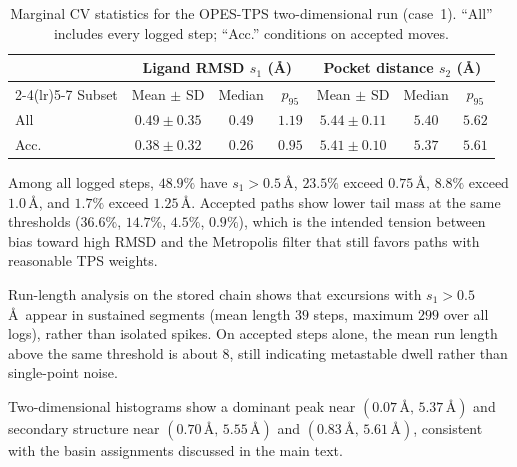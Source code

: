 \begin{table}[t]
\centering
\caption{Marginal CV statistics for the OPES-TPS two-dimensional run (case~1). ``All'' includes every logged step; ``Acc.'' conditions on accepted moves.}
\label{tab:cv-stats-si}
\begin{tabular}{lcccccc}
\toprule
 & \multicolumn{3}{c}{Ligand RMSD $s_1$ (\AA)} & \multicolumn{3}{c}{Pocket distance $s_2$ (\AA)} \\
\cmidrule(lr){2-4}\cmidrule(lr){5-7}
Subset & Mean $\pm$ SD & Median & $p_{95}$ & Mean $\pm$ SD & Median & $p_{95}$ \\
\midrule
All  & $0.49 \pm 0.35$ & $0.49$ & $1.19$ & $5.44 \pm 0.11$ & $5.40$ & $5.62$ \\
Acc. & $0.38 \pm 0.32$ & $0.26$ & $0.95$ & $5.41 \pm 0.10$ & $5.37$ & $5.61$ \\
\bottomrule
\end{tabular}
\end{table}

Among all logged steps, $48.9\%$ have $s_1 > 0.5$\,\AA, $23.5\%$ exceed $0.75$\,\AA, $8.8\%$ exceed $1.0$\,\AA, and $1.7\%$ exceed $1.25$\,\AA. Accepted paths show lower tail mass at the same thresholds ($36.6\%$, $14.7\%$, $4.5\%$, $0.9\%$), which is the intended tension between bias toward high RMSD and the Metropolis filter that still favors paths with reasonable TPS weights.

Run-length analysis on the stored chain shows that excursions with $s_1 > 0.5$\,\AA\ appear in sustained segments (mean length $39$ steps, maximum $299$ over all logs), rather than isolated spikes. On accepted steps alone, the mean run length above the same threshold is about $8$, still indicating metastable dwell rather than single-point noise.

Two-dimensional histograms show a dominant peak near $(0.07\,\text{\AA},\,5.37\,\text{\AA})$ and secondary structure near $(0.70\,\text{\AA},\,5.55\,\text{\AA})$ and $(0.83\,\text{\AA},\,5.61\,\text{\AA})$, consistent with the basin assignments discussed in the main text.
